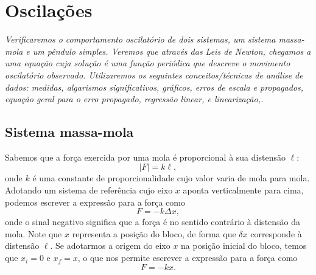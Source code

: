 \chapter{Oscilações}
\label{Chap:ExpOscilacoes}

\begin{fullwidth}\it
	Verificaremos o comportamento oscilatório de dois sistemas, um sistema massa-mola e um pêndulo simples. Veremos que através das Leis de Newton, chegamos a uma equação cuja solução é uma função periódica que descreve o movimento oscilatório observado. Utilizaremos os seguintes conceitos/técnicas de análise de dados: medidas, algarismos significativos, gráficos, erros de escala e propagados, equação geral para o erro propagado, regressão linear, e linearização,.
\end{fullwidth}

\section{Sistema massa-mola}

Sabemos que a força exercida por uma mola é proporcional à sua distensão $\ell$:
\begin{equation}
	|F| = k \ell,
\end{equation}
%
onde $k$ é uma constante de proporcionalidade cujo valor varia de mola para mola. Adotando um sistema de referência cujo eixo $x$ aponta verticalmente para cima, podemos escrever a expressão para a força como
\begin{equation}
    F = -k \Delta x,
\end{equation}
%
onde o sinal negativo significa que a força é no sentido contrário à distensão da mola. Note que $x$ representa a posição do bloco, de forma que $\delta x$ corresponde à distensão $\ell$. Se adotarmos a origem do eixo $x$ na posição inicial do bloco, temos que $x_i = 0$ e $x_f = x$, o que nos permite escrever a expressão para a força como
\begin{equation}
    F = -kx.
\end{equation}

